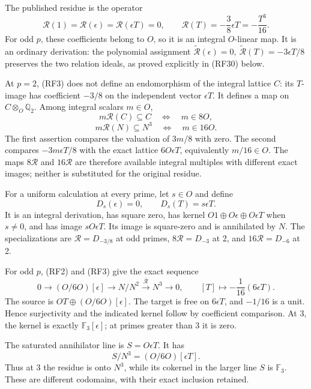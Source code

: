 \documentclass[
  10pt,
]{article}
\begin{document}
The published residue is the operator \[
\mathcal R(1)=\mathcal R(\epsilon)=\mathcal R(\epsilon T)=0,\qquad
\mathcal R(T)=-\frac38\epsilon T=-\frac{T^3}{16}.
\tag{RF3}
\] For odd \(p\), these coefficients belong to \(O\), so it is an
integral \(O\)-linear map. It is an ordinary derivation: the polynomial
assignment \(\widetilde{\mathcal R}(\epsilon)=0,\ 
\widetilde{\mathcal R}(T)=-3\epsilon T/8\) preserves the two relation
ideals, as proved explicitly in (RF30) below.

At \(p=2\), (RF3) does not define an endomorphism of the integral
lattice \(C\): its \(T\)-image has coefficient \(-3/8\) on the
independent vector \(\epsilon T\). It defines a map on
\(C\otimes_O\mathbb Q_2\). Among integral scalars \(m\in O\), \[
m\mathcal R(C)\subseteq C
\quad\Longleftrightarrow\quad m\in8O,
\] \[
m\mathcal R(N)\subseteq N^3
\quad\Longleftrightarrow\quad m\in16O.
\tag{RF4}
\] The first assertion compares the valuation of \(3m/8\) with zero. The
second compares \(-3m\epsilon T/8\) with the exact lattice
\(6O\epsilon T\), equivalently \(m/16\in O\). The maps \(8\mathcal R\)
and \(16\mathcal R\) are therefore available integral multiples with
different exact images; neither is substituted for the original residue.

For a uniform calculation at every prime, let \(s\in O\) and define \[
D_s(\epsilon)=0,\qquad D_s(T)=s\epsilon T.
\tag{RF5}
\] It is an integral derivation, has square zero, has kernel
\(O1\oplus O\epsilon\oplus O\epsilon T\) when \(s\ne0\), and has image
\(sO\epsilon T\). Its image is square-zero and is annihilated by \(N\).
The specializations are \(\mathcal R=D_{-3/8}\) at odd primes,
\(8\mathcal R=D_{-3}\) at 2, and \(16\mathcal R=D_{-6}\) at 2.

For odd \(p\), (RF2) and (RF3) give the exact sequence \[
0\longrightarrow(O/6O)[\epsilon]
\longrightarrow N/N^2
\xrightarrow{\overline{\mathcal R}}N^3
\longrightarrow0,
\qquad
[T]\longmapsto-\frac1{16}(6\epsilon T).
\tag{RF6}
\] The source is \(OT\oplus(O/6O)[\epsilon]\). The target is free on
\(6\epsilon T\), and \(-1/16\) is a unit. Hence surjectivity and the
indicated kernel follow by coefficient comparison. At 3, the kernel is
exactly \(\mathbb F_3[\epsilon]\); at primes greater than 3 it is zero.

The saturated annihilator line is \(S=O\epsilon T\). It has \[
S/N^3=(O/6O)[\epsilon T].
\tag{RF7}
\] Thus at 3 the residue is onto \(N^3\), while its cokernel in the
larger line \(S\) is \(\mathbb F_3\). These are different codomains,
with their exact inclusion retained.
\end{document}
